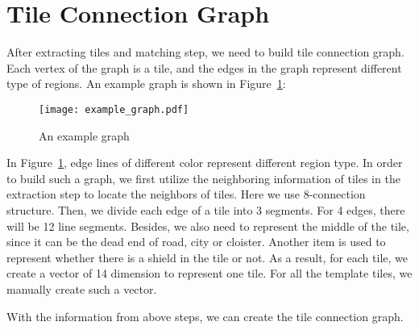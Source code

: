 \section{Tile Connection Graph}
After extracting tiles and matching step, we need to build tile connection graph. Each vertex of the graph is a tile, and the edges in the 
graph represent different type of regions. An example graph is shown in Figure~\ref{eg_graph}:

\begin{figure}[htbp]
	  \centering
	  \texttt{[image: example\_graph.pdf]}
	  \caption{An example graph}
	  \label{eg_graph}
\end{figure}

In Figure~\ref{eg_graph}, edge lines of different color represent different region type. In order to build such a graph, we first utilize the 
neighboring information of tiles in the extraction step to locate the neighbors of tiles. Here we use 8-connection structure. Then, we divide each edge of a tile into 3 segments. For 4 edges, there will be 12 line segments. Besides, we also need to represent the middle of the tile, since it can be the dead end of road, city or cloister. Another item is used to represent whether there is a shield in the tile or not. As a 
result, for each tile, we create a vector of 14 dimension to represent one tile. For all the template tiles, we manually create such a vector.

With the information from above steps, we can create the tile connection graph. 